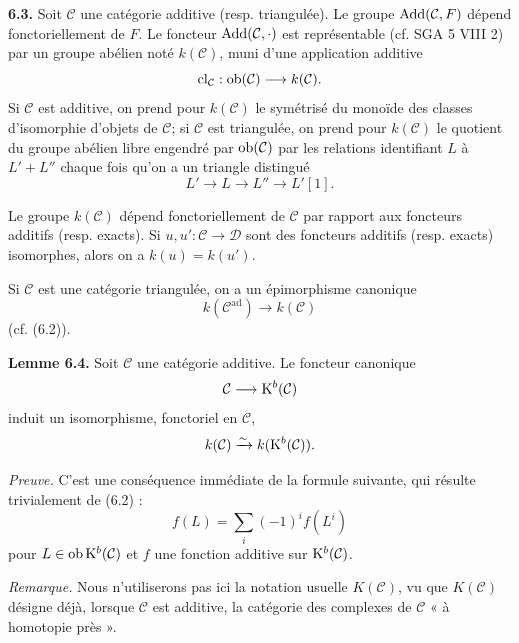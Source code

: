 \documentclass[11pt]{article}
\newcommand{\cl}{\operatorname{cl}}
\begin{document}
\textbf{6.3.} Soit \(\mathcal C\) une catégorie additive (resp. triangulée). Le groupe \(\operatorname{Add}(\mathcal C,F)\) dépend fonctoriellement de \(F\). Le foncteur \(\operatorname{Add}(\mathcal C,\cdot)\) est représentable (cf. SGA 5 VIII 2) par un groupe abélien noté \(k(\mathcal C)\), muni d'une application additive
\[
  \cl_{\mathcal C}:\Ob(\mathcal C)\longrightarrow k(\mathcal C).
\]
Si \(\mathcal C\) est additive, on prend pour \(k(\mathcal C)\) le symétrisé du monoïde des classes d'isomorphie d'objets de \(\mathcal C\); si \(\mathcal C\) est triangulée, on prend pour \(k(\mathcal C)\) le quotient du groupe abélien libre engendré par \(\operatorname{ob}(\mathcal C)\) par les relations identifiant \(L\) à \(L'+L''\) chaque fois qu'on a un triangle distingué
\[
  L'\longrightarrow L\longrightarrow L''\longrightarrow L'[1].
\]

Le groupe \(k(\mathcal C)\) dépend fonctoriellement de \(\mathcal C\) par rapport aux foncteurs additifs (resp. exacts). Si \(u,u':\mathcal C\to\mathcal D\) sont des foncteurs additifs (resp. exacts) isomorphes, alors on a \(k(u)=k(u')\).

Si \(\mathcal C\) est une catégorie triangulée, on a un épimorphisme canonique
\[
  k(\mathcal C^{\mathrm{ad}})\longrightarrow k(\mathcal C)
\]
(cf. (6.2)).

\textbf{Lemme 6.4.} Soit \(\mathcal C\) une catégorie additive. Le foncteur canonique
\[
  \mathcal C\longrightarrow \mathrm K^b(\mathcal C)
\]
induit un isomorphisme, fonctoriel en \(\mathcal C\),
\[
  k(\mathcal C)\xrightarrow{\sim} k(\mathrm K^b(\mathcal C)).
\]

\emph{Preuve.} C'est une conséquence immédiate de la formule suivante, qui résulte trivialement de (6.2) :
\begin{equation}\tag{6.4.1}
  f(L)=\sum_i (-1)^i f(L^i)
\end{equation}
pour \(L\in\operatorname{ob}\mathrm K^b(\mathcal C)\) et \(f\) une fonction additive sur \(\mathrm K^b(\mathcal C)\).

\emph{Remarque.} Nous n'utiliserons pas ici la notation usuelle \(K(\mathcal C)\), vu que \(K(\mathcal C)\) désigne déjà, lorsque \(\mathcal C\) est additive, la catégorie des complexes de \(\mathcal C\) « à homotopie près ».
\end{document}
